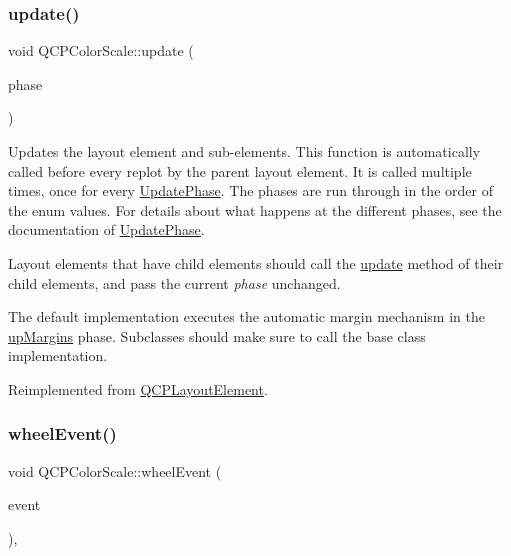 \subsubsection{\texorpdfstring{update()}{update()}}
{\footnotesize\ttfamily void Q\+C\+P\+Color\+Scale\+::update (\begin{DoxyParamCaption}\item[{\mbox{\hyperlink{class_q_c_p_layout_element_a0d83360e05735735aaf6d7983c56374d}{Update\+Phase}}}]{phase }\end{DoxyParamCaption})\hspace{0.3cm}{\ttfamily [virtual]}}

Updates the layout element and sub-\/elements. This function is automatically called before every replot by the parent layout element. It is called multiple times, once for every \mbox{\hyperlink{class_q_c_p_layout_element_a0d83360e05735735aaf6d7983c56374d}{Update\+Phase}}. The phases are run through in the order of the enum values. For details about what happens at the different phases, see the documentation of \mbox{\hyperlink{class_q_c_p_layout_element_a0d83360e05735735aaf6d7983c56374d}{Update\+Phase}}.

Layout elements that have child elements should call the \mbox{\hyperlink{class_q_c_p_color_scale_a259dcb6d3053a2cc3c197e9b1191ddbe}{update}} method of their child elements, and pass the current {\itshape phase} unchanged.

The default implementation executes the automatic margin mechanism in the \mbox{\hyperlink{class_q_c_p_layout_element_a0d83360e05735735aaf6d7983c56374da288cb59a92280e47261a341f2813e676}{up\+Margins}} phase. Subclasses should make sure to call the base class implementation. 

Reimplemented from \mbox{\hyperlink{class_q_c_p_layout_element_a929c2ec62e0e0e1d8418eaa802e2af9b}{Q\+C\+P\+Layout\+Element}}.

\mbox{\label{class_q_c_p_color_scale_a63cf19be184f6670c9495ad3a9a1baeb}} 
\subsubsection{\texorpdfstring{wheelEvent()}{wheelEvent()}}
{\footnotesize\ttfamily void Q\+C\+P\+Color\+Scale\+::wheel\+Event (\begin{DoxyParamCaption}\item[{Q\+Wheel\+Event $\ast$}]{event }\end{DoxyParamCaption})\hspace{0.3cm}{\ttfamily [protected]}, {\ttfamily [virtual]}}

